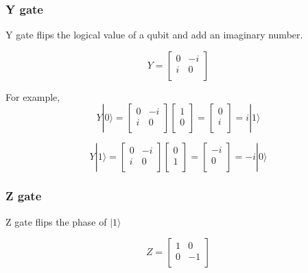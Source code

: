 \subsubsection{Y gate}

Y gate flips the logical value of a qubit and add an imaginary number.

$$ Y = \begin{bmatrix}
0 & -i \\
i & 0 \\
\end{bmatrix}
$$

For example,
$$ Y|0\rangle = \begin{bmatrix}
0 & -i \\
i & 0 \\
\end{bmatrix} 
\left[
\begin{array}{c}
1 \\
0 \\
\end{array}
\right]
= \left[
\begin{array}{c}
0 \\
i \\
\end{array}
\right]
= i|1\rangle
$$

$$ Y|1\rangle = \begin{bmatrix}
0 & -i \\
i & 0 \\
\end{bmatrix} 
\left[
\begin{array}{c}
0 \\
1  \\
\end{array}
\right]
= \left[
\begin{array}{c}
-i \\
0 \\
\end{array}
\right]
= -i|0\rangle
$$

\subsubsection{Z gate}

Z gate flips the phase of $ |1\rangle$

$$ Z = \begin{bmatrix}
1 & 0 \\
0 & -1 \\
\end{bmatrix}
$$

